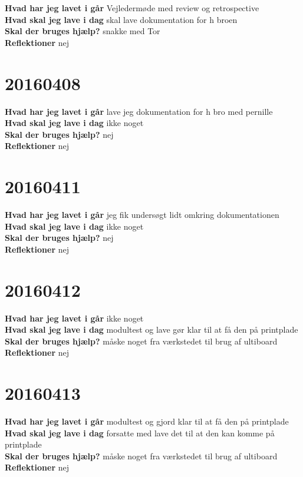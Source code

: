 \documentclass{article}
\begin{document}
						\textbf{Hvad har jeg lavet i går}
						Vejledermøde med review og retrospective
						\\
						\textbf{Hvad skal jeg lave i dag}
						skal lave dokumentation for h broen
						\\
						\textbf{Skal der bruges hjælp?}
						snakke med Tor
						\\
						\textbf{Reflektioner}
						nej	
						
	\section{20160408}
	
	\textbf{Hvad har jeg lavet i går}
	lave jeg dokumentation for h bro med pernille
	\\
	\textbf{Hvad skal jeg lave i dag}
	ikke noget
	\\
	\textbf{Skal der bruges hjælp?}
	nej
	\\
	\textbf{Reflektioner}
	nej	
		
		
		\section{20160411}
		
		\textbf{Hvad har jeg lavet i går}
		jeg fik undersøgt lidt omkring dokumentationen
		\\
		\textbf{Hvad skal jeg lave i dag}
		ikke noget
		\\
		\textbf{Skal der bruges hjælp?}
		nej
		\\
		\textbf{Reflektioner}
		nej		
		
			\section{20160412}
			
			\textbf{Hvad har jeg lavet i går}
			ikke noget
			\\
			\textbf{Hvad skal jeg lave i dag}
			modultest og lave gør klar til at få den på printplade
			\\
			\textbf{Skal der bruges hjælp?}
			måske noget fra værkstedet til brug af ultiboard
			\\
			\textbf{Reflektioner}
			nej		
			

	\section{20160413}
	
	\textbf{Hvad har jeg lavet i går}
	modultest og gjord klar til at få den på printplade
	\\
	\textbf{Hvad skal jeg lave i dag}
	forsatte med lave det til at den kan komme på printplade
	\\
	\textbf{Skal der bruges hjælp?}
	måske noget fra værkstedet til brug af ultiboard
	\\
	\textbf{Reflektioner}
	nej	
\end{document}
